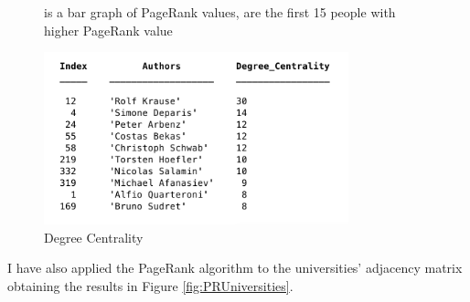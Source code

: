 \documentclass[]{usiinfbachelorproject}
\begin{document}
\begin{figure}[tb]
	\centering
	\caption{  is a bar graph of PageRank values,  are the first 15 people with higher PageRank value}
	\label{fig:PRAuthors}
\end{figure}

\begin{figure}[tb]
	\centering
	\includegraphics[height=5cm]{img/Analysis/degree_centrality}
	\caption{Degree Centrality}
	\label{fig:degree}
\end{figure}

I have also applied the PageRank algorithm to the universities' adjacency matrix obtaining the results in Figure \ref{fig:PRUniversities}.
\end{document}
